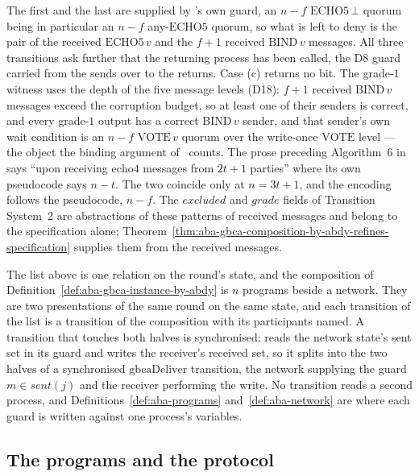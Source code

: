 The first and the last are supplied by
's own guard, an $n{-}f$
$\mathrm{ECHO5}\,\bot$ quorum being in particular an $n{-}f$ any-$\mathrm{ECHO5}$ quorum, so what is left to deny is the pair of the received $\mathrm{ECHO5}\,v$ and the $f{+}1$ received $\mathrm{BIND}\,v$ messages.
All three transitions ask further that the returning process has been called, the D8 guard carried from the sends over to the returns.
Case (c) returns no bit.
The grade-$1$ witness uses the depth of the five message levels (D18): $f{+}1$ received $\mathrm{BIND}\,v$ messages exceed the corruption budget, so at least one of their senders is correct, and every grade-$1$ output has a correct $\mathrm{BIND}\,v$ sender, and that sender's own wait condition is an $n{-}f$ $\mathrm{VOTE}\,v$ quorum over the write-once $\mathrm{VOTE}$ level --- the object the binding argument of~\cite{ABDY22} counts.
The prose preceding Algorithm~6 in~\cite{ABDY22} says ``upon receiving $\mathrm{echo4}$ messages from $2t+1$ parties'' where its own pseudocode says $n - t$.
The two coincide only at $n = 3t+1$, and the encoding follows the pseudocode, $n - f$.
The $excluded$ and $grade$ fields of Transition System~2 are abstractions of these patterns of received messages and belong to the specification alone; Theorem~\ref{thm:aba-gbca-composition-by-abdy-refines-specification} supplies them from the received messages.

The list above is one relation on the round's state, and the composition of Definition~\ref{def:aba-gbca-instance-by-abdy} is $n$ programs beside a network.
They are two presentations of the same round on the same state, and each transition of the list is a transition of the composition with its participants named.
A transition that touches both halves is synchronised:
 reads the network state's sent set
in its guard and writes the receiver's received set, so it splits into the two halves of a synchronised $\mathrm{gbcaDeliver}$ transition, the network supplying the guard $m \in \mathit{sent}(j)$ and the receiver performing the write.
No transition reads a second process, and Definitions~\ref{def:aba-programs} and~\ref{def:aba-network} are where each guard is written against one process's variables.


\subsection{The programs and the protocol}

